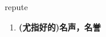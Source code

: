 
\begin{frame}
{\huge repute}
\begin{center}
\begin{enumerate}\Large
  \item \textbf{(尤指好的)名声，名誉}
\end{enumerate}
\end{center}
\end{frame}
